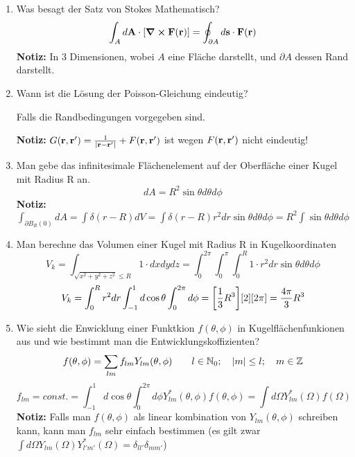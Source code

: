 \documentclass{scrartcl}
\newcommand{\rr}[1]{\frac{#1}{\abs{\vb{r}-\vb{r}'}}}
\newcommand{\ds}{\displaystyle}
\begin{document}
\begin{enumerate}
    \item Was besagt der Satz von Stokes Mathematisch?
          $$\ds \int_A d\vb A \cdot \qty[\curl \vb F(\vb r)]=
           \oint_{\partial A}d\vb s\cdot \vb F(\vb r)$$
          \textbf{Notiz:} In 3 Dimensionen, wobei $A$ eine Fläche 
          darstellt,
          und $\partial A$ dessen Rand darstellt.

    \item Wann ist die Lösung der Poisson-Gleichung eindeutig?
          \begin{center}
            Falls die Randbedingungen vorgegeben sind.
          \end{center}
          \textbf{Notiz:} $G(\vb r, \vb r')=\rr{1} + F(\vb r, \vb r')$ 
          ist wegen $F(\vb r, \vb r')$ nicht eindeutig!
          
    \item Man gebe das infinitesimale Flächenelement auf der Oberfläche 
          einer Kugel mit Radius R an.
          $$\ds dA = R^2\sin\theta d\theta d\phi$$
          \textbf{Notiz:} $\ds\int_{\partial B_R(0)} dA=\int\delta(r-R)dV
           =\int \delta(r-R)r^2dr\sin\theta d\theta d\phi
           =R^2 \int \sin\theta d\theta d\phi$

    \item Man berechne das Volumen einer Kugel mit Radius R 
          in Kugelkoordinaten\\
          $$\ds V_k=\int_{\sqrt{x^2+y^2+z^2}\le R} 1\cdot dxdydz
           =\int_0^{2\pi}\int_0^\pi\int_0^R 1\cdot r^2dr 
            \sin\theta d\theta d\phi$$
          $$\ds V_k=\int_0^R r^2 dr \int_{-1}^{1} d\cos\theta 
                   \int_0^{2\pi}d\phi
           =\qty[\frac{1}{3}R^3]\qty[2]\qty[2\pi]=\frac{4\pi}{3}R^3$$

    \item Wie sieht die Enwicklung einer Funktkion $f(\theta,\phi)$ in
          Kugelflächenfunkionen aus und wie bestimmt man die 
          Entwicklungskoffizienten?
          $$\ds f(\theta, \phi)=\sum_{lm} f_{lm}Y_{lm}(\theta,\phi)
          \qquad l\in \mathbb{N}_0;\quad \abs{m}\le l; 
          \quad m\in\mathbb{Z}$$
          $$\ds f_{lm}=const.
           =\int_{-1}^{1} d\cos\theta\int_0^{2\pi}d\phi 
           Y^*_{lm}(\theta,\phi)f(\theta,\phi)
           =\int d\Omega Y^*_{lm}(\Omega)f(\Omega)$$
           \textbf{Notiz:} Falls man $f(\theta,\phi)$ als linear kombination
           von $Y_{lm}(\theta,\phi)$ schreiben kann, kann man $f_{lm}$
           sehr einfach bestimmen (es gilt zwar $\ds \int d\Omega 
           Y_{lm}(\Omega)Y_{l'm'}^*(\Omega)=\delta_{ll'}\delta_{mm'}$)


\end{enumerate}
\end{document}
